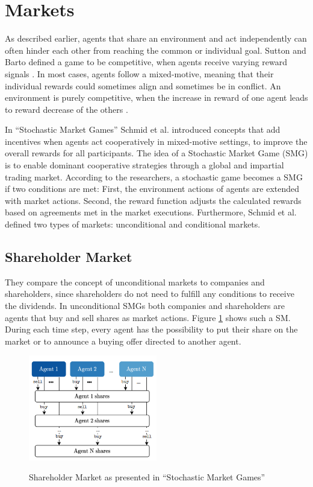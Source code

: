 \section{Markets}\label{market}
As described earlier, agents that share an environment and act independently can often hinder each other from reaching the common or individual goal. Sutton and Barto defined a game to be competitive, when agents receive varying reward signals \cite{suba18}. In most cases, agents follow a mixed-motive, meaning that their individual rewards could sometimes align and sometimes be in conflict. An environment is purely competitive, when the increase in reward of one agent leads to reward decrease of the others \cite{scbe21}.

In ``Stochastic Market Games'' \cite{scbe21} Schmid et al. introduced concepts that add incentives when agents act cooperatively in mixed-motive settings, to improve the overall rewards for all participants. The idea of a Stochastic Market Game (SMG) is to enable dominant cooperative strategies through a global and impartial trading market. According to the researchers, a stochastic game becomes a SMG if two conditions are met: First, the environment actions of agents are extended with market actions. Second, the reward function adjusts the calculated rewards based on agreements met in the market executions. Furthermore, Schmid et al. defined two types of markets: unconditional and conditional markets.

\subsection{Shareholder Market}
They compare the concept of unconditional markets to companies and shareholders, since shareholders do not need to fulfill any conditions to receive the dividends. In unconditional SMGs both companies and shareholders are agents that buy and sell shares as market actions. Figure \ref{fig:sm} shows such a SM. During each time step, every agent has the possibility to put their share on the market or to announce a buying offer directed to another agent.

\begin{figure}[hpbt]
    \centering
    \includegraphics[width=0.5\textwidth]{pictures/SMG_sm}\\
    \caption[Shareholder Market]{Shareholder Market as presented in ``Stochastic Market Games'' \cite{scbe21}}\label{fig:sm}
\end{figure}

